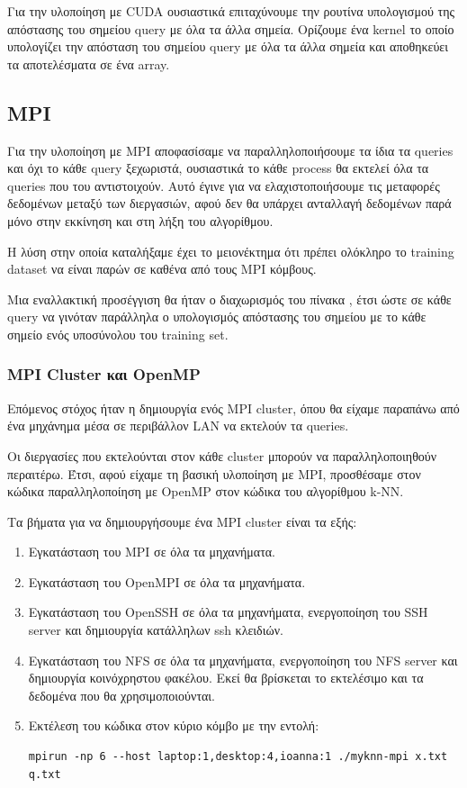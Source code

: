 \documentclass[11pt]{scrartcl} %
\begin{document}
Για την υλοποίηση με CUDA ουσιαστικά επιταχύνουμε την ρουτίνα υπολογισμού της απόστασης του σημείου
query με όλα τα άλλα σημεία.
Ορίζουμε ένα kernel  το οποίο υπολογίζει την απόσταση του σημείου query με όλα τα άλλα σημεία 
και αποθηκεύει τα αποτελέσματα σε ένα array.

\subsection{MPI}

Για την υλοποίηση με MPI αποφασίσαμε να παραλληλοποιήσουμε τα ίδια τα queries και όχι το κάθε query ξεχωριστά, 
ουσιαστικά το κάθε process θα εκτελεί όλα τα queries που του αντιστοιχούν.
Αυτό έγινε για να ελαχιστοποιήσουμε τις μεταφορές δεδομένων μεταξύ των διεργασιών, αφού δεν θα υπάρχει ανταλλαγή δεδομένων παρά μόνο στην εκκίνηση και στη λήξη του αλγορίθμου.

Η λύση στην οποία καταλήξαμε έχει το μειονέκτημα ότι πρέπει ολόκληρο το training dataset να είναι παρών σε καθένα από 
τους MPI κόμβους.

Μια εναλλακτική προσέγγιση θα ήταν ο διαχωρισμός του πίνακα , έτσι ώστε σε κάθε query
να γινόταν παράλληλα ο υπολογισμός απόστασης του σημείου  με το κάθε σημείο ενός υποσύνολου του training set.

\subsubsection{MPI Cluster και OpenMP}

Επόμενος στόχος ήταν η δημιουργία ενός MPI cluster, όπου θα είχαμε παραπάνω από ένα μηχάνημα μέσα σε περιβάλλον LAN να εκτελούν τα queries.

Οι διεργασίες που εκτελούνται στον κάθε cluster μπορούν να παραλληλοποιηθούν περαιτέρω.
Έτσι, αφού είχαμε τη βασική υλοποίηση με MPI, προσθέσαμε στον κώδικα παραλληλοποίηση με OpenMP στον κώδικα του αλγορίθμου k-NN.

Τα βήματα για να δημιουργήσουμε ένα MPI cluster είναι τα εξής:

\begin{enumerate}
\item Εγκατάσταση του MPI σε όλα τα μηχανήματα.
\item Εγκατάσταση του OpenMPI σε όλα τα μηχανήματα.
\item Εγκατάσταση του OpenSSH σε όλα τα μηχανήματα, ενεργοποίηση του SSH server και δημιουργία κατάλληλων ssh κλειδιών.
\item Εγκατάσταση του NFS \cite{nfs} σε όλα τα μηχανήματα, ενεργοποίηση του NFS server και
        δημιουργία κοινόχρηστου φακέλου. Εκεί θα βρίσκεται το εκτελέσιμο και τα
        δεδομένα που θα χρησιμοποιούνται.
\item Εκτέλεση του κώδικα στον κύριο κόμβο με την εντολή:
\begin{lstlisting}
mpirun -np 6 --host laptop:1,desktop:4,ioanna:1 ./myknn-mpi x.txt q.txt
\end{lstlisting}
\end{enumerate}
\end{document}
